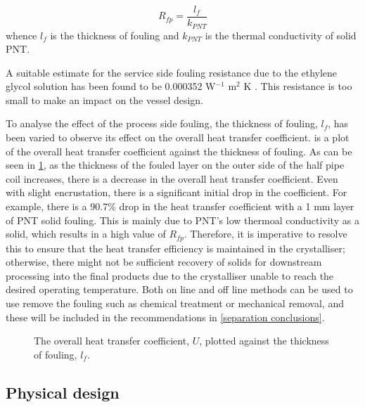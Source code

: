 \begin{equation} \label{eq:fouling}
    R_{fp} = \frac{l_f}{k_{PNT}}
\end{equation}
whence $l_f$ is the thickness of fouling and $k_{PNT}$ is the thermal conductivity of solid PNT. 

A suitable estimate for the service side fouling resistance due to the ethylene glycol solution has been found to be 0.000352 W$^{-1}$ m$^2$ K \cite{noauthor_fouling_2021}. This resistance is too small to make an impact on the vessel design. 

To analyse the effect of the process side fouling, the thickness of fouling, $l_f$, has been varied to observe its effect on the overall heat transfer coefficient.  is a plot of the overall heat transfer coefficient against the thickness of fouling. As can be seen in \cref{fig:fouling sensitivity}, as the thickness of the fouled layer on the outer side of the half pipe coil increases, there is a decrease in the overall heat transfer coefficient. Even with slight encrustation, there is a significant initial drop in the coefficient. For example, there is a 90.7\% drop in the heat transfer coefficient with a 1 mm layer of PNT solid fouling. This is mainly due to PNT's low thermoal conductivity as a solid, which results in a high value of $R_{fp}$. Therefore, it is imperative to resolve this to ensure that the heat transfer efficiency is maintained in the crystalliser; otherwise, there might not be sufficient recovery of solids for downstream processing into the final products due to the crystalliser unable to reach the desired operating temperature. Both on line and off line methods can be used to use remove the fouling such as chemical treatment or mechanical removal, and these will be included in the recommendations in \cref{separation conclusions}.

\begin{figure}[h]
    \centering
    
    \caption{The overall heat transfer coefficient, $U$, plotted against the thickness of fouling, $l_f$.}
    \label{fig:fouling sensitivity}
\end{figure}



\subsection{Physical design} \label{sec:physical design crystalliser}

